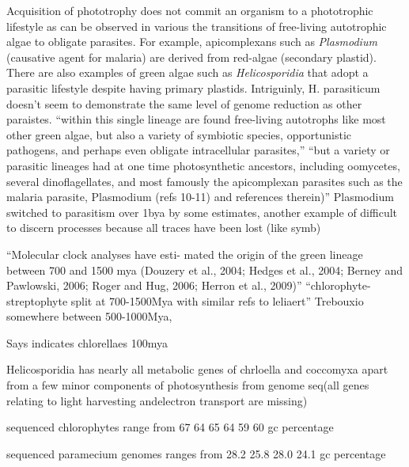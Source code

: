 Acquisition of phototrophy does not commit an organism to a phototrophic lifestyle
as can be observed in various the transitions of free-living autotrophic algae 
to obligate parasites.  For example, apicomplexans such as \textit{Plasmodium} 
(causative agent for malaria) are derived from red-algae (secondary plastid).
There are also examples of green algae such as \textit{Helicosporidia} that 
adopt a parasitic lifestyle despite having primary plastids. 
Intriguinly, H. parasiticum doesn't seem to demonstrate the same level of
genome reduction as other paraistes.\citep{Pombert2014}
``within this single lineage are found free-living autotrophs like most
other green algae, but also a variety of symbiotic species,
opportunistic pathogens, and perhaps even obligate intracellular
parasites,''
``but a variety or parasitic lineages
had at one time photosynthetic ancestors, including oomycetes,
several dinoflagellates, and most famously the apicomplexan
parasites such as the malaria parasite, Plasmodium (refs 10-11)
and references therein)''
\citep{Pombert2014}
Plasmodium switched to parasitism over 1bya by some estimates, another example
of difficult to discern processes because all traces have been lost (like symb)



``Molecular clock analyses have esti- mated the origin of the green lineage between 700 and 1500 mya (Douzery et al., 2004; Hedges et al., 2004; Berney and Pawlowski, 2006; Roger and Hug, 2006; Herron et al., 2009)''
\citep{Leliaert2012}
``chlorophyte-streptophyte split at 700-1500Mya with similar refs to leliaert'' \citep{DeWever2009}
Trebouxio somewhere between 500-1000Mya, \citep{DeWever2009}



Says \citep{DeWever2009} indicates chlorellaes 100mya \citep{Pombert2014}

Helicosporidia has nearly all metabolic genes of chrloella and coccomyxa apart from
a few minor components of photosynthesis \citep{Pombert2014} from genome seq(all genes relating to light harvesting andelectron transport are missing)




sequenced chlorophytes range from  67 64 65 64 59 60 gc percentage \citep{Blanc2010a}

sequenced paramecium genomes ranges from 28.2 25.8 28.0 24.1 gc percentage \citep{McGrath2014}







